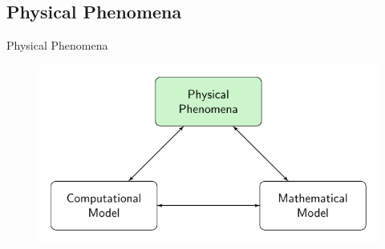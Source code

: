 \documentclass[handout]{beamer}
\begin{document}
\subsection{Physical Phenomena}
\begin{frame}{Physical Phenomena}
	\begin{figure}
		\includegraphics[width=\textwidth]{./Pics/ModelDiagrams/FlowChartHigh1G.pdf}
	\end{figure}
\end{frame}
\end{document}
